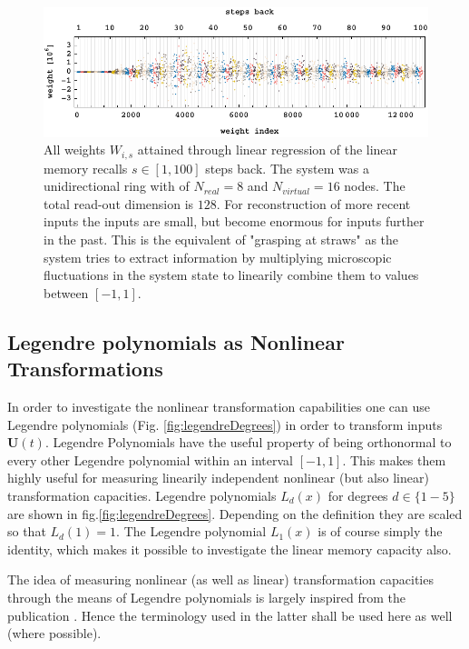 \begin{figure}
	\centering
	\includegraphics[width=0.99\linewidth]{pics/weight_plot}
	\caption{All weights $W_{i,s}$ attained through linear regression of the linear memory recalls $s \in [1,100]$ steps back. The system was a unidirectional ring with of $N_{real}=8$ and $N_{virtual}=16$ nodes. The total read-out dimension is $128$. For reconstruction of more recent inputs the inputs are small, but become enormous for inputs further in the past. This is the equivalent of "grasping at straws" as the system tries to extract information by multiplying microscopic fluctuations in the system state to linearily combine them to values between $[-1,1]$.}
	\label{fig:linearMemoryRecallWeights}
\end{figure}



\subsection{Legendre polynomials as Nonlinear Transformations}

In order to investigate the nonlinear transformation capabilities one can use Legendre polynomials  (Fig. \ref{fig:legendreDegrees}) in order to transform inputs $\textbf{U}(t)$.	Legendre Polynomials have the useful property of being orthonormal to every other Legendre polynomial within an interval $\left[-1,1\right]$. This makes them highly useful for measuring linearily independent nonlinear (but also linear) transformation capacities. Legendre polynomials $L_{d}(x)$ for degrees $d \in \{1-5\}$ are shown in fig.\ref{fig:legendreDegrees}. Depending on the definition they are scaled so that $L_{d}(1)=1$. The Legendre polynomial $L_{1}(x)$ is of course simply the identity, which makes it possible to investigate the linear memory capacity also.

The idea of measuring nonlinear (as well as linear) transformation capacities through the means of Legendre polynomials is largely inspired from the publication \cite{DAM12}. Hence the terminology used in the latter shall be used here as well (where possible). 

